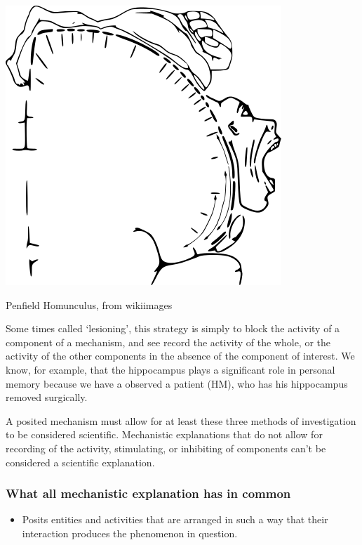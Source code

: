 \begin{refsection}
\begin{marginfigure}
\begin{center}
     \includegraphics{../Images/Motor_homunculus.png}

\end{center}
 \caption{Penfield Homunculus, from wikiimages}
\label{fig: MattachinePamphlet}
\end{marginfigure}


 Some times called `lesioning', this strategy is simply to block the activity of a component of a mechanism, and see record the activity of the whole, or the activity of the other components in the absence of the component of interest. We know, for example, that the hippocampus plays a significant role in personal memory because we have a observed a patient (HM), who has his hippocampus removed surgically. ~\citep{Scoville:1957wx}

A posited mechanism must allow for at least these three methods of investigation to be considered scientific. Mechanistic explanations that do not allow for recording of the activity, stimulating, or inhibiting of components can't be considered a scientific explanation. 

\subsubsection{What all mechanistic explanation has in common}
\label{whatallmechanisticexplanationhasincommon}

\begin{itemize}
\item Posits entities and activities that are arranged in such a way that their interaction produces the phenomenon in question.


\end{itemize}
\end{refsection}
